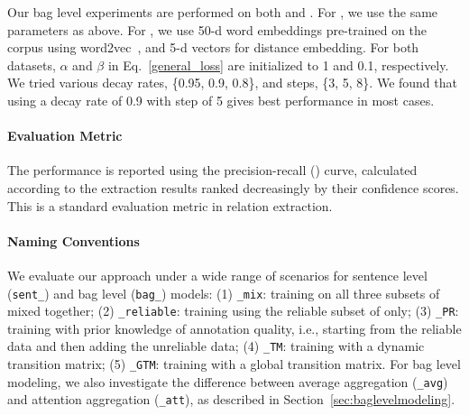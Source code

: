 Our bag level experiments are performed on both  \TimeRE and  \EntityRE. For \TimeRE, we use the same parameters as above.
For \EntityRE, we use 50-d word embeddings pre-trained on the \NYT corpus using word2vec~\cite{word2vec},
and 5-d vectors for distance embedding.
For both datasets,  $\alpha$ and $\beta$ in Eq.~\ref{general_loss} are initialized to 1 and 0.1, respectively. We tried various decay rates, \{0.95, 0.9, 0.8\}, and steps, \{3, 5, 8\}. We found that using a decay rate of 0.9 with step of 5 gives best performance in most cases.

\paragraph{Evaluation Metric}
The performance is reported using the precision-recall (\PR) curve, calculated according to the extraction results ranked decreasingly by their confidence scores. This is a standard evaluation metric in relation extraction.

\paragraph{Naming Conventions}
We evaluate our approach under a wide range of scenarios for
 sentence level
(\texttt{sent\_}) and bag level (\texttt{bag\_}) models:
(1) \texttt{\_mix}:  training on all three subsets of \TimeRE mixed together;
(2) \texttt{\_reliable}:  training using the reliable subset of \TimeRE only;
(3) \texttt{\_PR}:  training with prior knowledge of annotation quality, i.e., starting from the reliable data and then adding the unreliable data;
(4) \texttt{\_TM}: training with a dynamic transition matrix;
(5) \texttt{\_GTM}:  training with a global transition matrix.
%
%
For bag level modeling, we also investigate the difference   %
between average aggregation (\texttt{\_avg})
and attention aggregation (\texttt{\_att}), as described in Section~\ref{sec:baglevelmodeling}.



